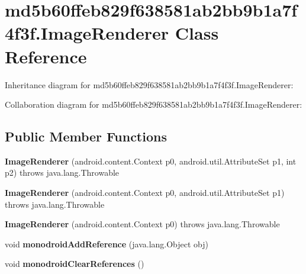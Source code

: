 \hypertarget{classmd5b60ffeb829f638581ab2bb9b1a7f4f3f_1_1_image_renderer}{}\section{md5b60ffeb829f638581ab2bb9b1a7f4f3f.\+Image\+Renderer Class Reference}
\label{classmd5b60ffeb829f638581ab2bb9b1a7f4f3f_1_1_image_renderer}


Inheritance diagram for md5b60ffeb829f638581ab2bb9b1a7f4f3f.\+Image\+Renderer\+:


Collaboration diagram for md5b60ffeb829f638581ab2bb9b1a7f4f3f.\+Image\+Renderer\+:
\subsection*{Public Member Functions}
\begin{DoxyCompactItemize}
\item 
\mbox{\label{classmd5b60ffeb829f638581ab2bb9b1a7f4f3f_1_1_image_renderer_ac24ca6c41669583419378dbb5e462a2e}} 
{\bfseries Image\+Renderer} (android.\+content.\+Context p0, android.\+util.\+Attribute\+Set p1, int p2)  throws java.\+lang.\+Throwable 	
\item 
\mbox{\label{classmd5b60ffeb829f638581ab2bb9b1a7f4f3f_1_1_image_renderer_ab5e414dafd0a921bee8ec84d29ab22e0}} 
{\bfseries Image\+Renderer} (android.\+content.\+Context p0, android.\+util.\+Attribute\+Set p1)  throws java.\+lang.\+Throwable 	
\item 
\mbox{\label{classmd5b60ffeb829f638581ab2bb9b1a7f4f3f_1_1_image_renderer_a8333cb061f46b6e67de6bd4d64f2f84d}} 
{\bfseries Image\+Renderer} (android.\+content.\+Context p0)  throws java.\+lang.\+Throwable 	
\item 
\mbox{\label{classmd5b60ffeb829f638581ab2bb9b1a7f4f3f_1_1_image_renderer_ad03b188cd2a6839322ff08fe076796f9}} 
void {\bfseries monodroid\+Add\+Reference} (java.\+lang.\+Object obj)
\item 
\mbox{\label{classmd5b60ffeb829f638581ab2bb9b1a7f4f3f_1_1_image_renderer_a4787f75a8b34aa5636dbd2a7df23c9bf}} 
void {\bfseries monodroid\+Clear\+References} ()
\end{DoxyCompactItemize}
